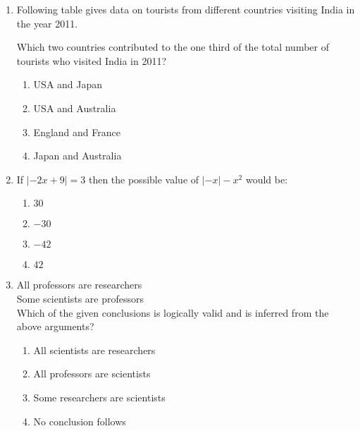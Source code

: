 \documentclass[journal]{IEEEtran}
\begin{document}
\begin{enumerate}
\item \label{Q.63} Following table gives data on tourists from different countries visiting India in the year 2011.

\begin{table}[h!]    
  \centering
  
\end{table}

Which two countries contributed to the one third of the total number of tourists who visited India in 2011?

\begin{enumerate}
    \item USA and Japan
    \item USA and Australia
    \item England and France
    \item Japan and Australia\\
\end{enumerate}

\item \label{Q.64} If $| -2x + 9 | = 3$ then the possible value of $| -x| - x^2$ would be:

\begin{enumerate}
    \item $30$
    \item $-30$
    \item $-42$
    \item $42$\\
\end{enumerate}
\item \label{Q.65}All professors are researchers\\
Some scientists are professors\\

Which of the given conclusions is logically valid and is inferred from the above arguments?

\begin{enumerate}
    \item All scientists are researchers
    \item All professors are scientists
    \item Some researchers are scientists
    \item No conclusion follows
\end{enumerate}

\end{enumerate}
\end{document}
